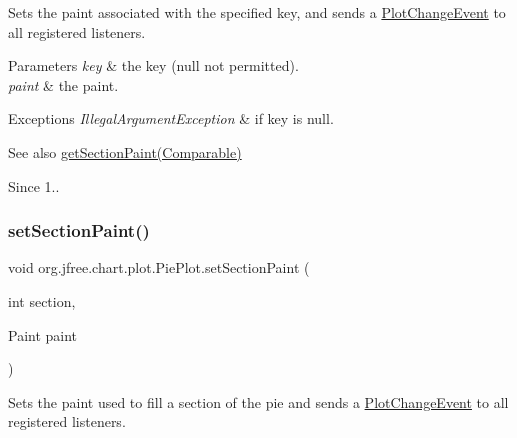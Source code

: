 Sets the paint associated with the specified key, and sends a \mbox{\hyperlink{}{Plot\+Change\+Event}} to all registered listeners.


\begin{DoxyParams}{Parameters}
{\em key} & the key ({\ttfamily null} not permitted). \\
\hline
{\em paint} & the paint.\\
\hline
\end{DoxyParams}

\begin{DoxyExceptions}{Exceptions}
{\em Illegal\+Argument\+Exception} & if {\ttfamily key} is {\ttfamily null}.\\
\hline
\end{DoxyExceptions}
\begin{DoxySeeAlso}{See also}
\mbox{\hyperlink{classorg_1_1jfree_1_1chart_1_1plot_1_1_pie_plot_a3de4031e87303ad438571b42b698324b}{get\+Section\+Paint(\+Comparable)}}
\end{DoxySeeAlso}
\begin{DoxySince}{Since}
1.. 
\end{DoxySince}
\mbox{\label{classorg_1_1jfree_1_1chart_1_1plot_1_1_pie_plot_a2248c7e942d62ad0635e50227c3413ce}} 
\subsubsection{\texorpdfstring{set\+Section\+Paint()}{setSectionPaint()}\hspace{0.1cm}{\footnotesize\ttfamily [3/3]}}
{\footnotesize\ttfamily void org.\+jfree.\+chart.\+plot.\+Pie\+Plot.\+set\+Section\+Paint (\begin{DoxyParamCaption}\item[{int}]{section,  }\item[{Paint}]{paint }\end{DoxyParamCaption})}

Sets the paint used to fill a section of the pie and sends a \mbox{\hyperlink{}{Plot\+Change\+Event}} to all registered listeners.


